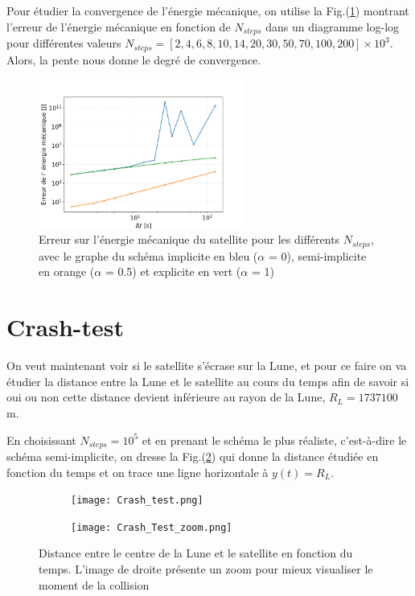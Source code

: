 \documentclass[a4paper,12pt,twoside]{article}
\begin{document}
Pour étudier la convergence de l'énergie mécanique, on utilise la Fig.(\ref{fig7}) montrant l'erreur de l'énergie mécanique en fonction de $N_{steps}$ dans un diagramme log-log pour différentes valeurs $N_{steps}=[2,4,6,8,10,14,20,30,50,70,100,200] \times 10^3$. Alors, la pente nous donne le degré de convergence.



\begin{figure}[H]
    \centering
    \includegraphics[width=0.6\textwidth]{Graphes/convergence_energie.png}
    \captionsetup{justification=centering}
    \caption{Erreur sur l'énergie mécanique du satellite pour les différents $N_{steps}$, avec le graphe du schéma implicite en bleu ($\alpha$ = 0), semi-implicite en orange ($\alpha$ = 0.5) et explicite en vert  ($\alpha$ = 1)}
    \label{fig7}
\end{figure}

\section{Crash-test}

On veut maintenant voir si le satellite s'écrase sur la Lune, et pour ce faire on va étudier la distance entre la Lune et le satellite au cours du temps afin de savoir si oui ou non cette distance devient inférieure au rayon de la Lune, $R_L=1737100$\,m.

En choisissant $N_{steps}=10^5$ et en prenant le schéma le plus réaliste, c'est-à-dire le schéma semi-implicite, on dresse la Fig.(\ref{fig8}) qui donne la distance étudiée en fonction du temps et on trace une ligne horizontale à $y(t)=R_L$.

\begin{figure}[H]
\begin{subfigure}{0.45\textwidth}  %
    \centering  %
    \texttt{[image: Crash\_test.png]}
\end{subfigure}
\hspace{0.05\textwidth}
\begin{subfigure}{0.45\textwidth}  %
    \centering  %
    \texttt{[image: Crash\_Test\_zoom.png]}
\end{subfigure}
\captionsetup{justification=centering}
\caption{Distance entre le centre de la Lune et le satellite en fonction du temps. L'image de droite présente un zoom pour mieux visualiser le moment de la collision}
\label{fig8}
\end{figure}
\end{document}
